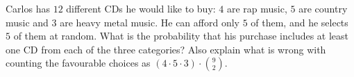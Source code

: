 Carlos has $12$ different CDs he would like to buy: $4$ are rap music, $5$ are country music and $3$ are heavy metal music. He can afford only $5$ of them, and he selects $5$ of them at random. What is the probability that his purchase includes at least one CD from each of the three categories? Also explain what is wrong with counting the favourable choices as $(4\cdot5\cdot3)\cdot\binom92$.
